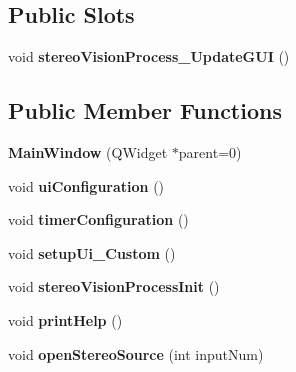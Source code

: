 \subsection*{Public Slots}
\begin{DoxyCompactItemize}
\item 
void {\bfseries stereo\+Vision\+Process\+\_\+\+Update\+G\+UI} ()\hypertarget{class_main_window_ab58219bc32f1d0a92b09c5eb33c4103b}{}\label{class_main_window_ab58219bc32f1d0a92b09c5eb33c4103b}

\end{DoxyCompactItemize}
\subsection*{Public Member Functions}
\begin{DoxyCompactItemize}
\item 
{\bfseries Main\+Window} (Q\+Widget $\ast$parent=0)\hypertarget{class_main_window_a8b244be8b7b7db1b08de2a2acb9409db}{}\label{class_main_window_a8b244be8b7b7db1b08de2a2acb9409db}

\item 
void {\bfseries ui\+Configuration} ()\hypertarget{class_main_window_a3527a1afb3344a1341fd80764713df2c}{}\label{class_main_window_a3527a1afb3344a1341fd80764713df2c}

\item 
void {\bfseries timer\+Configuration} ()\hypertarget{class_main_window_a50b34c2c0abf492a47587359634f0aa0}{}\label{class_main_window_a50b34c2c0abf492a47587359634f0aa0}

\item 
void {\bfseries setup\+Ui\+\_\+\+Custom} ()\hypertarget{class_main_window_aea0de3a599029b5f64f2a37dcebd8f86}{}\label{class_main_window_aea0de3a599029b5f64f2a37dcebd8f86}

\item 
void {\bfseries stereo\+Vision\+Process\+Init} ()\hypertarget{class_main_window_ad9655d307add03b591a644d3cbb60284}{}\label{class_main_window_ad9655d307add03b591a644d3cbb60284}

\item 
void {\bfseries print\+Help} ()\hypertarget{class_main_window_a64de1a7ba9c614b9b3bb86811f5e8bc2}{}\label{class_main_window_a64de1a7ba9c614b9b3bb86811f5e8bc2}

\item 
void {\bfseries open\+Stereo\+Source} (int input\+Num)\hypertarget{class_main_window_a9d9628939cd5f05b608835e85724163e}{}\label{class_main_window_a9d9628939cd5f05b608835e85724163e}


\end{DoxyCompactItemize}
